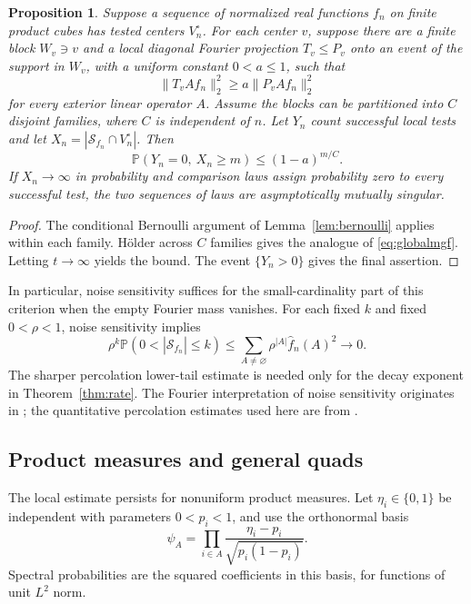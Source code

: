 \documentclass[11pt]{amsart}
\newtheorem{proposition}[theorem]{Proposition}
\theoremstyle{remark}
\newcommand{\Prob}{\mathbb P}
\newcommand{\cS}{\mathcal S}
\begin{document}
\begin{proposition}\label{prop:criterion}
Suppose a sequence of normalized real functions $f_n$ on finite product cubes has tested centers $V_n^\circ$. For each center $v$, suppose there are a finite block $W_v\ni v$ and a local diagonal Fourier projection $T_v\le P_v$ onto an event of the support in $W_v$, with a uniform constant $0<a\le1$, such that
\[
 \|T_vAf_n\|_2^2\ge a\|P_vAf_n\|_2^2
\]
for every exterior linear operator $A$. Assume the blocks can be partitioned into $C$ disjoint families, where $C$ is independent of $n$. Let $Y_n$ count successful local tests and let $X_n=|\cS_{f_n}\cap V_n^\circ|$. Then
\[
 \Prob(Y_n=0,\ X_n\ge m)\le(1-a)^{m/C}.
\]
If $X_n\to\infty$ in probability and comparison laws assign probability zero to every successful test, the two sequences of laws are asymptotically mutually singular.
\end{proposition}
\begin{proof}
The conditional Bernoulli argument of Lemma~\ref{lem:bernoulli} applies within each family. H\"older across $C$ families gives the analogue of \eqref{eq:globalmgf}. Letting $t\to\infty$ yields the bound. The event $\{Y_n>0\}$ gives the final assertion.
\end{proof}

In particular, noise sensitivity suffices for the small-cardinality part of this criterion when the empty Fourier mass vanishes. For each fixed $k$ and fixed $0<\rho<1$, noise sensitivity implies
\[
 \rho^k\Prob(0<|\cS_{f_n}|\le k)
 \le\sum_{A\ne\varnothing}\rho^{|A|}\widehat f_n(A)^2\longrightarrow0.
\]
The sharper percolation lower-tail estimate is needed only for the decay exponent in Theorem~\ref{thm:rate}. The Fourier interpretation of noise sensitivity originates in \cite{BKS}; the quantitative percolation estimates used here are from \cite{GPS}.

\subsection{Product measures and general quads}\label{sec:extensions}

The local estimate persists for nonuniform product measures. Let $\eta_i\in\{0,1\}$ be independent with parameters $0<p_i<1$, and use the orthonormal basis
\[
 \psi_A=\prod_{i\in A}\frac{\eta_i-p_i}{\sqrt{p_i(1-p_i)}}.
\]
Spectral probabilities are the squared coefficients in this basis, for functions of unit $L^2$ norm.
\end{document}

